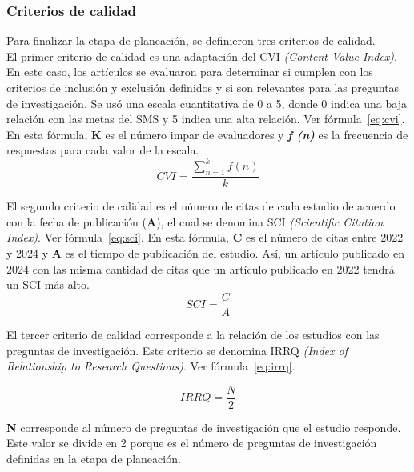 \subsubsection{Criterios de calidad}\label{subsec:criterios_calidad}

Para finalizar la etapa de planeación, se definieron tres criterios de calidad. \\

El primer criterio de calidad es una adaptación del CVI \textit{(Content Value Index)}.
En este caso, los artículos se evaluaron para determinar si cumplen con los criterios de inclusión y exclusión definidos y si son relevantes
para las preguntas de investigación. Se usó una escala cuantitativa de 0 a 5, donde 0 indica una baja relación con las metas del SMS y 5 
indica una alta relación. Ver fórmula~\ref{eq:cvi}. En esta fórmula, \textbf{K} es el número impar de evaluadores y \textbf{\textit{f (n)}} 
es la frecuencia de respuestas para cada valor de la escala.\\

\begin{equation}
    \label{eq:cvi}
    CVI = \frac{\sum_{n=1}^{k} f(n)}{k}
\end{equation}

El segundo criterio de calidad es el número de citas de cada estudio de acuerdo con la fecha de publicación (\textbf{A}), el cual se 
denomina SCI \textit{(Scientific Citation Index)}. Ver fórmula~\ref{eq:sci}. En esta fórmula, \textbf{C} es el número de citas entre 2022 y 
2024 y \textbf{A} es el tiempo de publicación del estudio. Así, un artículo publicado en 2024 con las misma cantidad de citas que un 
artículo publicado en 2022 tendrá un SCI más alto.\\

\begin{equation}
    \label{eq:sci}
    SCI = \frac{C}{A}
\end{equation}

El tercer criterio de calidad corresponde a la relación de los estudios con las preguntas de investigación. Este criterio se denomina 
IRRQ \textit{(Index of Relationship to Research Questions)}. Ver fórmula~\ref{eq:irrq}.

\begin{equation}
    \label{eq:irrq}
    IRRQ = \frac{N}{2}
\end{equation}

\textbf{N} corresponde al número de preguntas de investigación que el estudio responde. Este valor se divide en 2 porque es el número de 
preguntas de investigación definidas en la etapa de planeación.\\